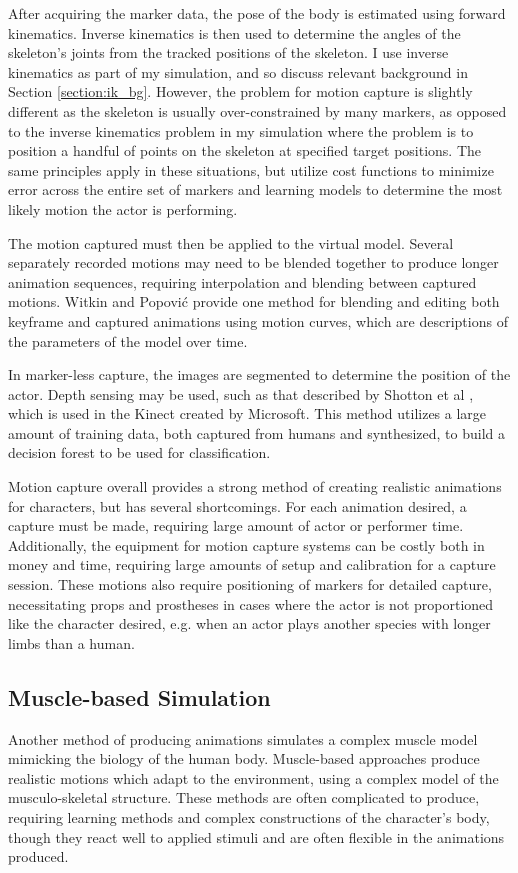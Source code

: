 After acquiring the marker data, the pose of the body is estimated using forward kinematics.  Inverse kinematics is then used to determine the angles of the skeleton's joints from the tracked positions of the skeleton.  I use inverse kinematics as part of my simulation, and so discuss relevant background in Section \ref{section:ik_bg}.  However, the problem for motion capture is slightly different as the skeleton is usually over-constrained by many markers, as opposed to the inverse kinematics problem in my simulation where the problem is to position a handful of points on the skeleton at specified target positions.  The same principles apply in these situations, but utilize cost functions to minimize error across the entire set of markers and learning models to determine the most likely motion the actor is performing.

The motion captured must then be applied to the virtual model.  Several separately recorded motions may need to be blended together to produce longer animation sequences, requiring interpolation and blending between captured motions.  Witkin and Popovi\'{c} provide one method for blending and editing both keyframe and captured animations using motion curves, which are descriptions of the parameters of the model over time.

In marker-less capture, the images are segmented to determine the position of the actor.  Depth sensing may be used, such as that described by Shotton et al \cite{shotton_kinect}, which is used in the Kinect created by Microsoft.  This method utilizes a large amount of training data, both captured from humans and synthesized, to build a decision forest to be used for classification.

Motion capture overall provides a strong method of creating realistic animations for characters, but has several shortcomings.  For each animation desired, a capture must be made, requiring large amount of actor or performer time.  Additionally, the equipment for motion capture systems can be costly both in money and time, requiring large amounts of setup and calibration for a capture session.  These motions also require positioning of markers for detailed capture, necessitating props and prostheses in cases where the actor is not proportioned like the character desired, e.g. when an actor plays another species with longer limbs than a human.

\subsection{Muscle-based Simulation}
\label{subsection:muscle_sim_bg}
Another method of producing animations simulates a complex muscle model mimicking the biology of the human body. Muscle-based approaches produce realistic motions which adapt to the environment, using a complex model of the musculo-skeletal structure. These methods are often complicated to produce, requiring learning methods and complex constructions of the character's body, though they react well to applied stimuli and are often flexible in the animations produced.

